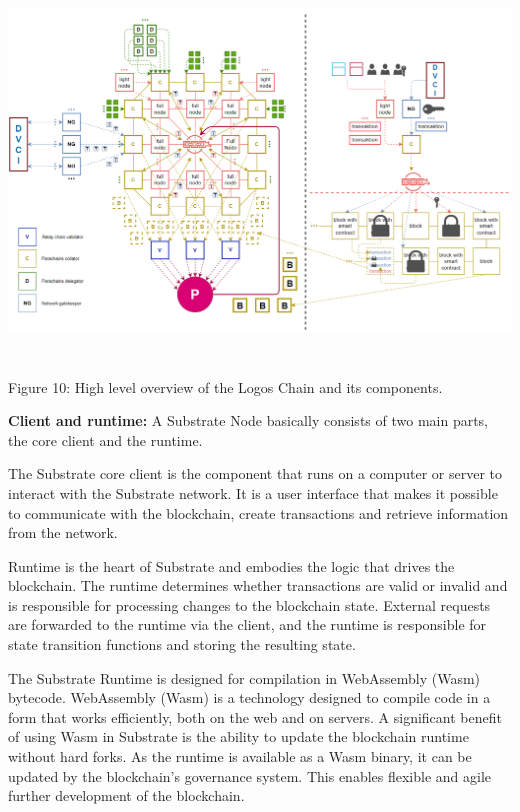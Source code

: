 \documentclass[]{article}
\begin{document}
\begin{center}
	\includegraphics[height=10cm]{logos-chain}
\end{center}
\begin{center}
	Figure 10: High level overview of the Logos Chain and its components.
	\newline
\end{center}

\textbf{Client and runtime:}
A Substrate Node basically consists of two main parts, the core client and the runtime.

The Substrate core client is the component that runs on a computer or server to interact with the Substrate network. 
It is a user interface that makes it possible to communicate with the blockchain, create transactions and retrieve information from the network.

Runtime is the heart of Substrate and embodies the logic that drives the blockchain.
The runtime determines whether transactions are valid or invalid and is responsible for processing changes to the blockchain state. 
External requests are forwarded to the runtime via the client, and the runtime is responsible for state transition functions and storing the resulting state.

The Substrate Runtime is designed for compilation in WebAssembly (Wasm) bytecode.
WebAssembly (Wasm) \cite{Webass} is a technology designed to compile code in a form that works efficiently, both on the web and on servers.
A significant benefit of using Wasm in Substrate is the ability to update the blockchain runtime without hard forks. 
As the runtime is available as a Wasm binary, it can be updated by the blockchain's governance system. 
This enables flexible and agile further development of the blockchain.
\newline
\end{document}
